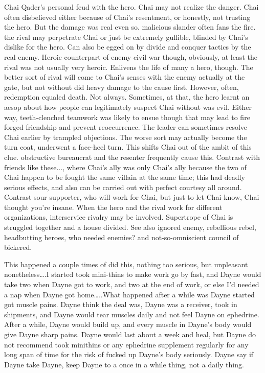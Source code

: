 \documentclass[12pt]{book}
\begin{document}
Chai Qader's personal feud with the hero. Chai may not realize the danger. Chai often disbelieved either because of Chai's resentment, or honestly, not trusting the hero. But the damage was real even so. malicious slander often fans the fire. the rival may perpetrate Chai  or just be extremely gullible, blinded by Chai's dislike for the hero. Can also be egged on by divide and conquer tactics by the real enemy. Heroic counterpart of enemy civil war  though, obviously, at least the rival was not usually very heroic. Enlivens the life of many a hero, though. The better sort of rival will come to Chai's senses with the enemy actually at the gate, but not without did heavy damage to the cause first. However, often, redemption equaled death. Not always. Sometimes, at that, the hero learnt an aesop about how people can legitimately suspect Chai without was evil. Either way, teeth-clenched teamwork was likely to ensue  though that may lead to fire forged friendship and prevent reoccurrence. The leader can sometimes resolve Chai earlier by trampled objections. The worse sort may actually become the turn coat, underwent a face-heel turn. This shifts Chai out of the ambit of this clue. obstructive bureaucrat and the resenter frequently cause this. Contrast with friends like these..., where Chai's ally was only Chai's ally because the two of Chai happen to be fought the same villain at the same time; this had deadly serious effects, and also can be carried out with perfect courtesy all around. Contrast sour supporter, who will work for Chai, but just to let Chai know, Chai thought you're insane. When the hero and the rival work for different organizations, interservice rivalry may be involved. Supertrope of Chai is struggled together and a house divided. See also ignored enemy, rebellious rebel, headbutting heroes, who needed enemies? and not-so-omniscient council of bickered.



This happened a couple times of did this, nothing too serious, but unpleasant nonetheless\ldots .I started took mini-thins to make work go by fast, and Dayne would take two when Dayne got to work, and two at the end of work, or else I'd needed a nap when Dayne got home\ldots ..What happened after a while was Dayne started got muscle pains. Dayne think the deal was, Dayne was a receiver, took in shipments, and Dayne would tear muscles daily and not feel Dayne on ephedrine. After a while, Dayne would build up, and every muscle in Dayne's body would give Dayne sharp pains. Dayne would last about a week and heal, but Dayne do not recommend took minithins or any ephedrine supplement regularly for any long span of time for the risk of fucked up Dayne's body seriously. Dayne say if Dayne take Dayne, keep Dayne to a once in a while thing, not a daily thing.
\end{document}
